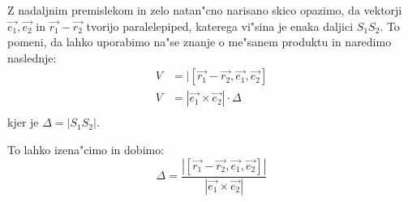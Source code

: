 Z nadaljnim premislekom in zelo natan"cno narisano skico opazimo, da vektorji $\vec{e_1}, \vec{e_2}$ in $\vec{r_1} - \vec{r_2}$ tvorijo paralelepiped, katerega vi"sina je enaka daljici $S_1S_2$. To pomeni, da lahko uporabimo na"se znanje o me"sanem produktu in naredimo naslednje:
\begin{align*}
V &= |[\vec{r_1} - \vec{r_2}, \vec{e_1}, \vec{e_2}]\\
V &= |\vec{e_1} \times \vec{e_2}| \cdot \Delta\\
\end{align*}
kjer je $\Delta = |S_1S_2|$.

To lahko izena"cimo in dobimo:
\begin{equation*}
\Delta = \dfrac{|[\vec{r_1} - \vec{r_2}, \vec{e_1}, \vec{e_2}]|}{|\vec{e_1} \times \vec{e_2}|}
\end{equation*}